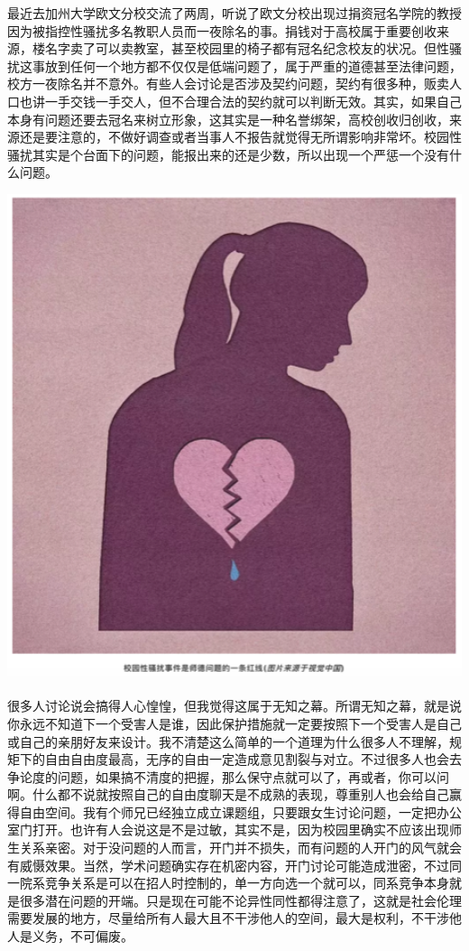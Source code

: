 \documentclass[
]{book}
\begin{document}
最近去加州大学欧文分校交流了两周，听说了欧文分校出现过捐资冠名学院的教授因为被指控性骚扰多名教职人员而一夜除名的事。捐钱对于高校属于重要创收来源，楼名字卖了可以卖教室，甚至校园里的椅子都有冠名纪念校友的状况。但性骚扰这事放到任何一个地方都不仅仅是低端问题了，属于严重的道德甚至法律问题，校方一夜除名并不意外。有些人会讨论是否涉及契约问题，契约有很多种，贩卖人口也讲一手交钱一手交人，但不合理合法的契约就可以判断无效。其实，如果自己本身有问题还要去冠名来树立形象，这其实是一种名誉绑架，高校创收归创收，来源还是要注意的，不做好调查或者当事人不报告就觉得无所谓影响非常坏。校园性骚扰其实是个台面下的问题，能报出来的还是少数，所以出现一个严惩一个没有什么问题。

\includegraphics[width=6.24in]{images/wuzhi1}

很多人讨论说会搞得人心惶惶，但我觉得这属于无知之幕。所谓无知之幕，就是说你永远不知道下一个受害人是谁，因此保护措施就一定要按照下一个受害人是自己或自己的亲朋好友来设计。我不清楚这么简单的一个道理为什么很多人不理解，规矩下的自由自由度最高，无序的自由一定造成意见割裂与对立。不过很多人也会去争论度的问题，如果搞不清度的把握，那么保守点就可以了，再或者，你可以问啊。什么都不说就按照自己的自由度聊天是不成熟的表现，尊重别人也会给自己赢得自由空间。我有个师兄已经独立成立课题组，只要跟女生讨论问题，一定把办公室门打开。也许有人会说这是不是过敏，其实不是，因为校园里确实不应该出现师生关系亲密。对于没问题的人而言，开门并不损失，而有问题的人开门的风气就会有威慑效果。当然，学术问题确实存在机密内容，开门讨论可能造成泄密，不过同一院系竞争关系是可以在招人时控制的，单一方向选一个就可以，同系竞争本身就是很多潜在问题的开端。只是现在可能不论异性同性都得注意了，这就是社会伦理需要发展的地方，尽量给所有人最大且不干涉他人的空间，最大是权利，不干涉他人是义务，不可偏废。
\end{document}
